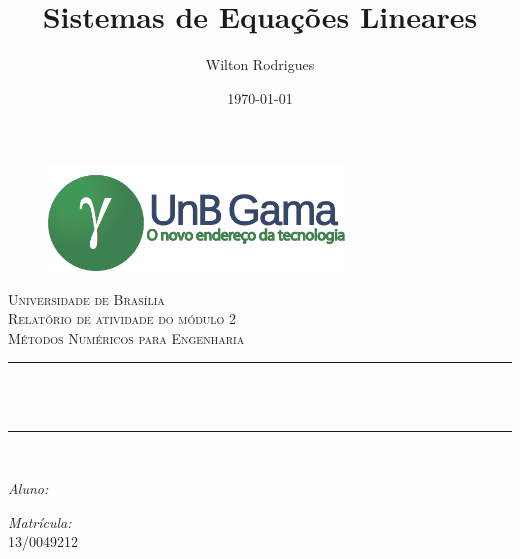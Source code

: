 \documentclass[12pt, hidelinks]{article}
\title{Sistemas de Equações Lineares}								%
\author{Wilton Rodrigues}								%
\date{\today}											%
\makeatletter
\let\thetitle\@title
\let\theauthor\@author
\let\thedate\@date
\makeatother
\begin{document}

\begin{titlepage}
  \centering
  \begin{figure}[H]
    \centering
    \includegraphics[width=0.7\textwidth]{figuras/logo.png}\\[2.0 cm]
  \end{figure}
  \textsc{\LARGE Universidade de Brasília}\\[2.5 cm]	%
  \textsc{\Large Relatório de atividade do módulo 2}\\[0.5 cm]				%
  \textsc{\large Métodos Numéricos para Engenharia}\\[1.5 cm]				%
  \rule{\linewidth}{0.2 mm} \\[0.4 cm]
  {\huge \bfseries \thetitle}\\
  \rule{\linewidth}{0.2 mm} \\[2.5 cm]

  \begin{minipage}{0.4\textwidth}
    \begin{flushleft} \large
      \emph{Aluno:}\\
      \theauthor
    \end{flushleft}
  \end{minipage}
  \begin{minipage}{0.4\textwidth}
    \begin{flushright} \large
      \emph{Matrícula:} \\
      13/0049212									%
    \end{flushright}
  \end{minipage}\\
  \vspace*{0.5in}
  {\large \thedate}\\[0.5 cm]

  \vfill

\end{titlepage}

\end{document}
